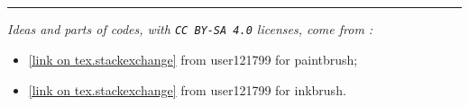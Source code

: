 \documentclass[11pt,a4paper]{ltxdoc}
\begin{document}
\begin{tcolorbox}[colframe=lightgray,colback=lightgray!5]
\end{tcolorbox}

\begin{tcolorbox}[colframe=lightgray,colback=lightgray!5]
\hfill{}\hfill~
\end{tcolorbox}

\begin{tcolorbox}[colframe=lightgray,colback=lightgray!5]
\hfill{}
\end{tcolorbox}

\begin{tcolorbox}[colframe=lightgray,colback=lightgray!5]
\hfill{}~~\hfill~
\end{tcolorbox}

\begin{tcolorbox}[colframe=lightgray,colback=lightgray!5]
\hfill{}\hfill~
\end{tcolorbox}

\vfill~

\hrule

\vspace*{5mm}

\textit{Ideas and parts of codes, with \texttt{CC\,BY-SA\,4.0} licenses, come from :}

\begin{itemize}
	\item \href{https://tex.stackexchange.com/questions/475141/simulating-paintbrush-strokes-in-tikz}{[link on tex.stackexchange]} from \textsf{user121799} for paintbrush;
	\item \href{https://tex.stackexchange.com/questions/460836/custom-line-cap-to-simulate-inked-line-in-tikz/460842#460842}{[link on tex.stackexchange]} from \textsf{user121799} for inkbrush.
\end{itemize}

\pagebreak


\hypertarget{matoc}{}

\tableofcontents

\vspace*{5mm}

\end{document}
